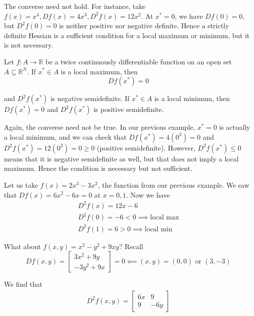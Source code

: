 \documentclass{article}
\begin{document}
\begin{remark}
  The converse need not hold. For instance, take $f(x) = x^4, Df(x) = 4x^3, D^2f(x) = 12x^2$. At $x^* = 0$, we have $Df(0) = 0$, but $D^2f(0) = 0$ is neither positive nor negative definite. Hence a strictly definite Hessian is a sufficient condition for a local maximum or minimum, but it is not necessary.
\end{remark}

\begin{theorem}
  Let $f: A \to \mathbb{R}$ be a twice continuously differentiable function on an open set $A \subseteq \mathbb{R}^N$. If $x^* \in A$ is a local maximum, then
  \[
    Df(x^*) = 0
  \]

  and $D^2f(x^*)$ is negative semidefinite. If $x^* \in A$ is a local minimum, then $Df(x^*) = 0$ and $D^2f(x^*)$ is positive semidefinite.
\end{theorem}

\begin{remark}
  Again, the converse need not be true. In our previous example, $x^* = 0$ is actually a local minimum, and we can check that $Df(x^*) = 4(0^3) = 0$ and $D^2f(x^*) = 12(0^2) = 0 \ge 0$ (positive semidefinite). However, $D^2f(x^*) \le 0$ means that it is negative semidefinite as well, but that does not imply a local maximum. Hence the condition is necessary but not sufficient.
\end{remark}

Let us take $f(x) = 2x^3 - 3x^2$, the function from our previous example. We saw that $Df(x) = 6x^2 - 6x = 0$ at $x = 0, 1$. Now we have
\begin{equation}
  \begin{array}{c}
    D^2f(x) = 12x - 6 \\
    D^2f(0) = - 6 < 0 \implies \text{local max} \\
    D^2f(1) = 6 > 0  \implies \text{local min}
  \end{array}
  \nonumber
\end{equation}

What about $f(x, y) = x^2 - y^2 + 9xy$? Recall
\[
  D f(x, y) = \left[\begin{matrix}
    3x^2 + 9y \\
    -3y^2 + 9x
  \end{matrix}\right]
  = 0
  \impliedby (x, y) = (0, 0) \text{ or } (3, -3)
\]

We find that
\begin{equation}
  \begin{array}{c}
    D^2 f(x, y) = \left[\begin{matrix}
        6x & 9 \\
        9  & -6y
    \end{matrix}\right]
  \end{array}
  \nonumber
\end{equation}
\end{document}

